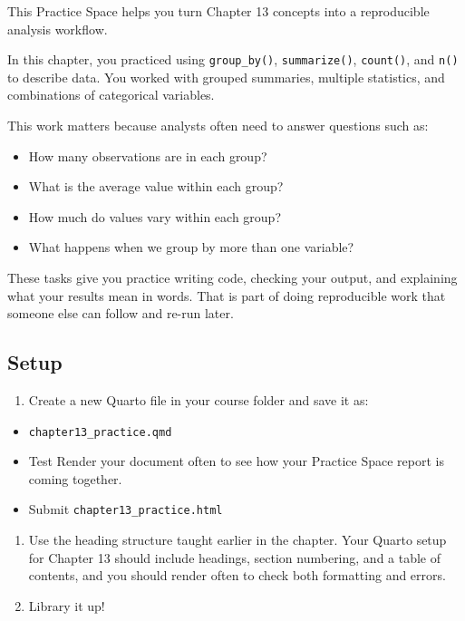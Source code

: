 \documentclass[
]{article}
\providecommand{\tightlist}{%
  \setlength{\itemsep}{0pt}\setlength{\parskip}{0pt}}
\begin{document}
This Practice Space helps you turn Chapter 13 concepts into a
reproducible analysis workflow.

In this chapter, you practiced using \texttt{group\_by()},
\texttt{summarize()}, \texttt{count()}, and \texttt{n()} to describe
data. You worked with grouped summaries, multiple statistics, and
combinations of categorical variables.

This work matters because analysts often need to answer questions such
as:

\begin{itemize}
\item
  How many observations are in each group?
\item
  What is the average value within each group?
\item
  How much do values vary within each group?
\item
  What happens when we group by more than one variable?
\end{itemize}

These tasks give you practice writing code, checking your output, and
explaining what your results mean in words. That is part of doing
reproducible work that someone else can follow and re-run later.

\subsection{Setup}\label{setup}

\begin{enumerate}
\def\labelenumi{\arabic{enumi}.}
\tightlist
\item
  Create a new Quarto file in your course folder and save it as:
\end{enumerate}

\begin{itemize}
\item
  \texttt{chapter13\_practice.qmd}
\item
  Test Render your document often to see how your Practice Space report
  is coming together.
\item
  Submit \texttt{chapter13\_practice.html}
\end{itemize}

\begin{enumerate}
\def\labelenumi{\arabic{enumi}.}
\setcounter{enumi}{1}
\item
  Use the heading structure taught earlier in the chapter. Your Quarto
  setup for Chapter 13 should include headings, section numbering, and a
  table of contents, and you should render often to check both
  formatting and errors.
\item
  Library it up!
\end{enumerate}
\end{document}

